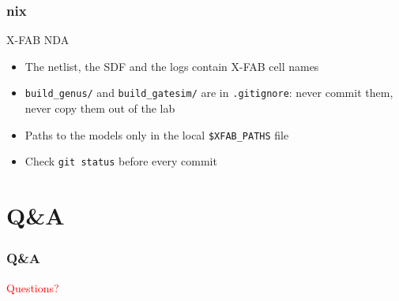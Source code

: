 \documentclass{beamer}
\newcommand{\astitle}{nix}
\newcommand{\assubtitle}{nix}
\newcommand{\cmd}[1]{\texttt{#1}}
\begin{document}
\renewcommand{\assubtitle}{X-FAB NDA}
\begin{frame}
\frametitle{\astitle}
\begin{block}{\assubtitle}
  \begin{itemize}
    \item The netlist, the SDF and the logs contain X-FAB cell names
    \item \cmd{build\_genus/} and \cmd{build\_gatesim/} are in
      \cmd{.gitignore}: never commit them, never copy them out of the lab
    \item Paths to the models only in the local \cmd{\$XFAB\_PATHS} file
    \item Check \cmd{git status} before every commit
  \end{itemize}
\end{block}
\end{frame}

\section{Q\&A}
\renewcommand{\astitle}{Q\&A}
\begin{frame}
\frametitle{\astitle}
\vfill
\centering
\begin{Huge}\textcolor{red}{Questions?}\end{Huge}
\vfill
\end{frame}
\end{document}
